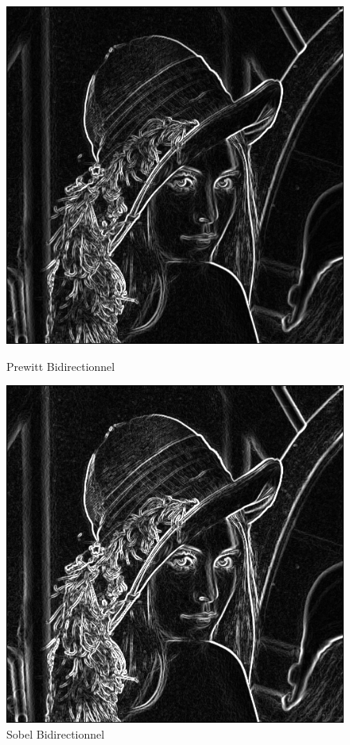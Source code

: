 \documentclass[11pt]{article}
\begin{document}
	\begin{figure}[H]
		\begin{minipage}[c]{.46\linewidth}
			\centering
			\includegraphics[scale=0.25]{Image/filtrePrewittBidirectionnel.png}
			\caption{Prewitt Bidirectionnel}
			\label{fig:PrewittBidirectionnel}
		\end{minipage} \hfill
		\begin{minipage}[c]{.46\linewidth}
		\centering
			\includegraphics[scale=0.25]{Image/filtreSobelBidirectionnel.png}
			\caption{Sobel Bidirectionnel}
			\label{fig:SobelBidirectionnel}
		\end{minipage}
	\end{figure}
\end{document}
